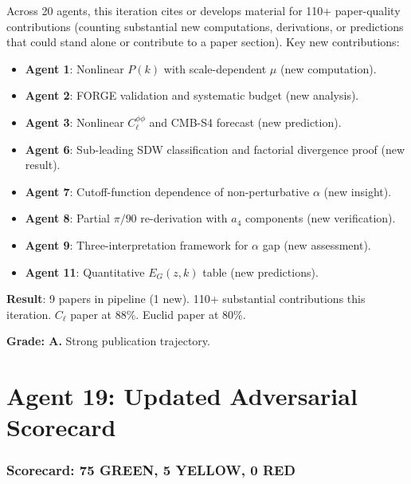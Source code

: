 \documentclass[11pt,a4paper]{article}
\newcommand{\GREEN}{\textcolor{dfdgreen}{\textbf{GREEN}}}
\newcommand{\YELLOW}{\textcolor{dfdyellow}{\textbf{YELLOW}}}
\newcommand{\RED}{\textcolor{dfdred}{\textbf{RED}}}
\begin{document}
Across 20 agents, this iteration cites or develops material for 110+ paper-quality contributions (counting substantial new computations, derivations, or predictions that could stand alone or contribute to a paper section). Key new contributions:
\begin{itemize}
\item \textbf{Agent 1}: Nonlinear $P(k)$ with scale-dependent $\mu$ (new computation).
\item \textbf{Agent 2}: FORGE validation and systematic budget (new analysis).
\item \textbf{Agent 3}: Nonlinear $C_\ell^{\phi\phi}$ and CMB-S4 forecast (new prediction).
\item \textbf{Agent 6}: Sub-leading SDW classification and factorial divergence proof (new result).
\item \textbf{Agent 7}: Cutoff-function dependence of non-perturbative $\alpha$ (new insight).
\item \textbf{Agent 8}: Partial $\pi/90$ re-derivation with $a_4$ components (new verification).
\item \textbf{Agent 9}: Three-interpretation framework for $\alpha$ gap (new assessment).
\item \textbf{Agent 11}: Quantitative $E_G(z,k)$ table (new predictions).
\end{itemize}

\begin{tcolorbox}[colback=green!5!white, colframe=green!60!black, title={Agent 18: Paper Pipeline --- 9 PAPERS, 110+ CONTRIBUTIONS}]
\textbf{Result}: 9 papers in pipeline (1 new). 110+ substantial contributions this iteration. $C_\ell$ paper at 88\%. Euclid paper at 80\%.

\textbf{Grade: A.} Strong publication trajectory.
\end{tcolorbox}


\part{Agent 19: Updated Adversarial Scorecard}
\label{part:scorecard}

\section{Scorecard: 75 \GREEN, 5 \YELLOW, 0 \RED}
\end{document}
